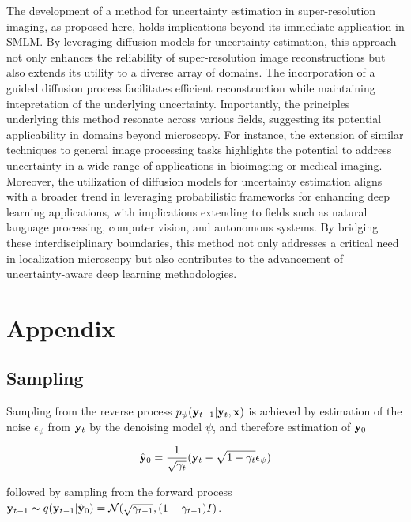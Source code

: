 \documentclass{article}
\begin{document}
The development of a method for uncertainty estimation in super-resolution imaging, as proposed here, holds implications beyond its immediate application in SMLM. By leveraging diffusion models for uncertainty estimation, this approach not only enhances the reliability of super-resolution image reconstructions but also extends its utility to a diverse array of domains. The incorporation of a guided diffusion process facilitates efficient reconstruction while maintaining intepretation of the underlying uncertainty. Importantly, the principles underlying this method resonate across various fields, suggesting its potential applicability in domains beyond microscopy. For instance, the extension of similar techniques to general image processing tasks highlights the potential to address uncertainty in a wide range of applications in bioimaging or medical imaging. Moreover, the utilization of diffusion models for uncertainty estimation aligns with a broader trend in leveraging probabilistic frameworks for enhancing deep learning applications, with implications extending to fields such as natural language processing, computer vision, and autonomous systems. By bridging these interdisciplinary boundaries, this method not only addresses a critical need in localization microscopy but also contributes to the advancement of uncertainty-aware deep learning methodologies.



 


\appendix

\section{Appendix}

\subsection{Sampling}

Sampling from the reverse process $p_{\psi}(\bold{y}_{t-1}|\bold{y}_{t},\bold{x})$ is achieved by estimation of the noise $\epsilon_{\psi}$ from $\bold{y}_{t}$ by the denoising model $\psi$, and therefore estimation of $\bold{y}_{0}$

\begin{equation}
\hat{\bold{y}}_{0} = \frac{1}{\sqrt{\gamma_{t}}}(\bold{y}_{t} - \sqrt{1-\gamma_{t}}\epsilon_{\psi})
\end{equation}

followed by sampling from the forward process $\bold{y}_{t-1} \sim q(\bold{y}_{t-1}|\hat{\bold{y}}_{0}) = \mathcal{N}(\sqrt{\gamma_{t-1}},(1-\gamma_{t-1})I)$. 
\end{document}
